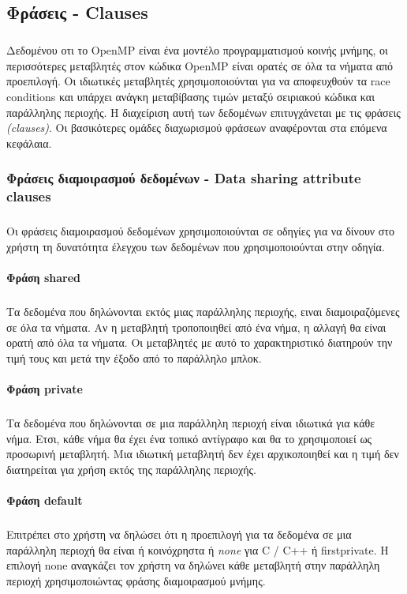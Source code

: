 \documentclass[12pt]{article}
\newcommand{\en}[1]{\foreignlanguage{english}{#1}}
\begin{document}
\clearpage
\subsection{Φράσεις - \en{Clauses}}
\subparagraph{}
Δεδομένου οτι το \en{OpenMP} είναι ένα μοντέλο προγραμματισμού κοινής μνήμης, οι περισσότερες μεταβλητές στον κώδικα \en{OpenMP} είναι ορατές σε όλα τα νήματα από προεπιλογή. Οι ιδιωτικές μεταβλητές χρησιμοποιούνται για να αποφευχθούν τα \en{race conditions} και υπάρχει ανάγκη μεταβίβασης τιμών μεταξύ σειριακού κώδικα και παράλληλης περιοχής. Η διαχείριση αυτή των δεδομένων επιτυγχάνεται με τις φράσεις \emph{\en{(clauses)}}. Οι βασικότερες ομάδες διαχωρισμού φράσεων αναφέρονται στα επόμενα κεφάλαια.

\subsubsection{Φράσεις διαμοιρασμού δεδομένων - \en{Data sharing attribute clauses}}
\subparagraph{}
Οι φράσεις διαμοιρασμού δεδομένων χρησιμοποιούνται σε οδηγίες για να δίνουν στο χρήστη τη δυνατότητα έλεγχου των δεδομένων που χρησιμοποιούνται στην οδηγία.

\paragraph{Φράση \en{shared}}
\subparagraph{}
Τα δεδομένα που δηλώνονται εκτός μιας παράλληλης περιοχής, ειναι διαμοιραζόμενες σε όλα τα νήματα. Αν η μεταβλητή τροποποιηθεί από ένα νήμα, η αλλαγή θα είναι ορατή από όλα τα νήματα. Οι μεταβλητές με αυτό το χαρακτηριστικό διατηρούν την τιμή τους και μετά την έξοδο από το παράλληλο μπλοκ.

\paragraph{Φράση \en{private}}
\subparagraph{}
Τα δεδομένα που δηλώνονται σε μια παράλληλη περιοχή είναι ιδιωτικά για κάθε νήμα. Ετσι, κάθε νήμα θα έχει ένα τοπικό αντίγραφο και θα το χρησιμοποιεί ως προσωρινή μεταβλητή. Μια ιδιωτική μεταβλητή δεν έχει αρχικοποιηθεί και η τιμή δεν διατηρείται για χρήση εκτός της παράλληλης περιοχής.

\paragraph{Φράση \en{default}}
\subparagraph{}
Επιτρέπει στο χρήστη να δηλώσει ότι η προεπιλογή για τα δεδομένα σε μια παράλληλη περιοχή θα είναι ή κοινόχρηστα ή \emph{\en{none}} για \en{C} / \en{C}++ ή {\en{firstprivate}}. Η επιλογή none αναγκάζει τον χρήστη να δηλώνει κάθε μεταβλητή στην παράλληλη περιοχή χρησιμοποιώντας φράσης διαμοιρασμού μνήμης.
\end{document}
